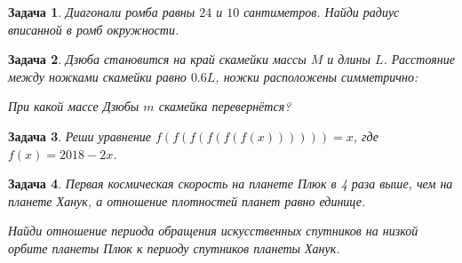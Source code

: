 \documentclass[a4paper, 12pt]{article}
\theoremstyle{break}
\newtheorem{problem}{Задача}[subsection]
\begin{document}
\begin{problem}
Диагонали ромба равны $24$ и $10$ сантиметров. Найди радиус вписанной в ромб окружности.
\end{problem}

\begin{problem}
Дзюба становится на край скамейки массы $M$ и длины $L$.
Расстояние между ножками скамейки равно $0.6L$,
ножки расположены симметрично:

\begin{minipage}{0.8\textwidth}
\begin{center}
\end{center}
\end{minipage}



При какой массе Дзюбы $m$ скамейка перевернётся?
\end{problem}



\begin{problem}
Реши уравнение $f(f(f(f(f(f(x)))))) = x$, где $f(x) = 2018 - 2x$.
\end{problem}



\begin{problem}
Первая космическая скорость на планете Плюк
в 4 раза выше, чем на планете Ханук, а отношение плотностей планет равно единице.

Найди отношение периода обращения искусственных спутников
на низкой орбите планеты Плюк к периоду спутников планеты Ханук.
\end{problem}
\end{document}
